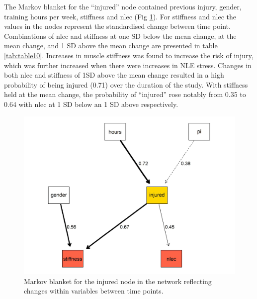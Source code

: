\documentclass[
  english,
  man]{apa6}
\begin{document}
The Markov blanket for the ``injured'' node contained previous injury, gender, training hours per week, stiffness and nlec (Fig \ref{fig:fig10}).
For stiffness and nlec the values in the nodes represent the standardised change between time point.
Combinations of nlec and stiffness at one SD below the mean change, at the mean change, and 1 SD above the mean change are presented in table \ref{tab:table10}.
Increases in muscle stiffness was found to increase the risk of injury, which was further increased when there were increases in NLE stress.
Changes in both nlec and stiffness of 1SD above the mean change resulted in a high probability of being injured (0.71) over the duration of the study.
With stiffness held at the mean change, the probability of ``injured'' rose notably from 0.35 to 0.64 with nlec at 1 SD below an 1 SD above respectively.

\begin{figure}

{\centering \includegraphics[width=1\linewidth]{figures_doc/Fig10} 

}

\caption{Markov blanket for the injured node in the network reflecting changes within variables between time points.}\label{fig:fig10}
\end{figure}
\end{document}
